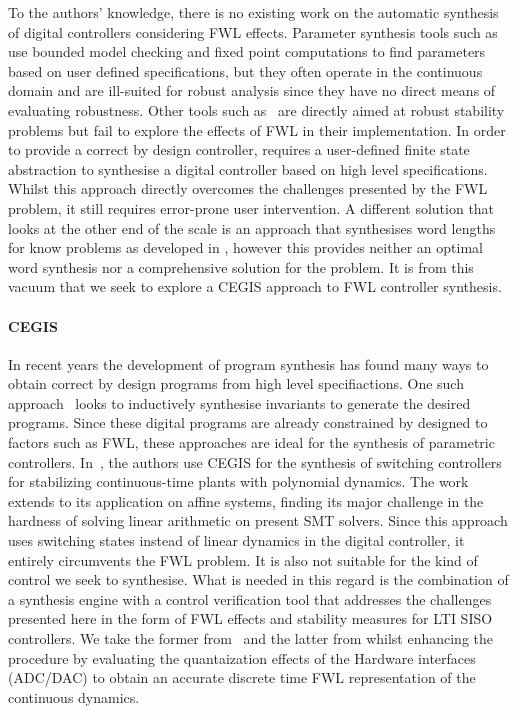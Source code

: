 \documentclass{sig-alternate-05-2015}
\begin{document}
To the authors' knowledge, there is no existing work on the automatic
synthesis of digital controllers considering FWL effects.  Parameter
synthesis tools such as~\cite{cimatti2013parameter} use bounded model
checking and fixed point computations to find parameters based on user
defined specifications, but they often operate in the continuous domain and
are ill-suited for robust analysis since they have no direct means of
evaluating robustness.  Other tools such as~\cite{economakos2016automated}
are directly aimed at robust stability problems but fail to explore the
effects of FWL in their implementation.  In order to provide a correct by
design controller, \cite{alur2016compositional} requires a user-defined
finite state abstraction to synthesise a digital controller based on high
level specifications.  Whilst this approach directly overcomes the
challenges presented by the FWL problem, it still requires error-prone user
intervention.  A different solution that looks at the other end of the scale
is an approach that synthesises word lengths for know problems as developed
in \cite{jha2013swati}, however this provides neither an optimal word
synthesis nor a comprehensive solution for the problem.  It is from this
vacuum that we seek to explore a CEGIS approach to FWL controller synthesis.

\paragraph{CEGIS}

In recent years the development of program synthesis has found many ways to
obtain correct by design programs from high level specifiactions.  One such
approach~\cite{itzhaky2010simple} looks to inductively synthesise invariants
to generate the desired programs.  Since these digital programs are already
constrained by designed to factors such as FWL, these approaches are ideal
for the synthesis of parametric controllers. 
In~\cite{DBLP:conf/cdc/RavanbakhshS15}, the authors use CEGIS for the
synthesis of switching controllers for stabilizing continuous-time plants
with polynomial dynamics.  The work extends to its application on affine
systems, finding its major challenge in the hardness of solving linear
arithmetic on present SMT solvers.  Since this approach uses switching
states instead of linear dynamics in the digital controller, it entirely
circumvents the FWL problem.  It is also not suitable for the kind of
control we seek to synthesise.  What is needed in this regard is the
combination of a synthesis engine with a control verification tool that
addresses the challenges presented here in the form of FWL effects and
stability measures for LTI SISO controllers.  We take the former
from~\cite{} and the latter from \cite{daes20161} whilst enhancing the
procedure by evaluating the quantaization effects of the Hardware interfaces
(ADC/DAC) to obtain an accurate discrete time FWL representation of the
continuous dynamics.
 
\end{document}
